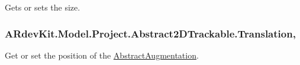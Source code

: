 Gets or sets the size. 

\hypertarget{class_a_rdev_kit_1_1_model_1_1_project_1_1_abstract2_d_trackable_acbb38387d30cb1239814606b54099bb3}{
\subsubsection[{Translation}]{ A\-Rdev\-Kit.\-Model.\-Project.\-Abstract2\-D\-Trackable.\-Translation\hspace{0.3cm}{\ttfamily [get]}, {\ttfamily [set]}}}\label{class_a_rdev_kit_1_1_model_1_1_project_1_1_abstract2_d_trackable_acbb38387d30cb1239814606b54099bb3}


Get or set the position of the \hyperlink{class_a_rdev_kit_1_1_model_1_1_project_1_1_abstract_augmentation}{Abstract\-Augmentation}. 

